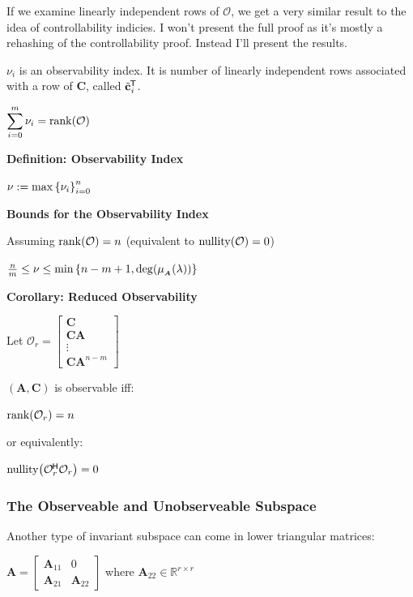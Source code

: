\documentclass[11pt]{article}
\begin{document}
  If we examine linearly independent rows of \(\mathcal{O}\), we get a very similar result to the idea of
  controllability indicies. I won't present the full proof as it's mostly a rehashing of the controllability proof.
  Instead I'll present the results.

  \(\nu_i\) is an observability index. It is number of linearly independent rows associated with a row of
  \(\bm{C}\), called \(\tilde{\mathbf{c}}^{\mkern-1.5mu\mathsf{T}}_i\).

  \(\displaystyle \sum_{i = 0}^m \nu_i = \rank(\mathcal{O})\)

  \textbf{Definition: Observability Index}

  \(\nu := \max {\left\{ \nu_i \right\}}_{i = 0}^n\)

  \textbf{Bounds for the Observability Index}

  Assuming \(\rank(\mathcal{O}) = n\) (equivalent to \(\mathrm{nullity}{\left( \mathcal{O} \right)} = 0\))

  \(\frac{n}{m} \le \nu \le \min{\left\{ n - m + 1, \mathrm{deg}{\left( \mu_{_{\bm{A}}}(\lambda) \right)} \right\}}\)

  \textbf{Corollary: Reduced Observability}

  Let \(\mathcal{O}_r = \begin{bmatrix}
    \bm{C} \\
    \bm{C}\bm{A}  \\
    \vdots \\
    \bm{C}\bm{A}^{n - m}
  \end{bmatrix}\)

  \((\bm{A}, \bm{C})\) is observable iff:

  \(\rank(\mathcal{O}_r) = n\)

  or equivalently:

  \(\mathrm{nullity}{\left( \mathcal{O}_r^{\mkern-1.5mu\mathsf{H}}\mathcal{O}_r \right)} = 0\)

  \pagebreak

  \subsubsection{The Observeable and Unobserveable Subspace}

  Another type of invariant subspace can come in lower triangular matrices:

  \(\bm{A} =
  \begin{bmatrix}
    \bm{A}_{11} & 0 \\
    \bm{A}_{21} & \bm{A}_{22}
  \end{bmatrix}\) where \(\bm{A}_{22} \in \mathbb{R}^{r \times r}\)
\end{document}
